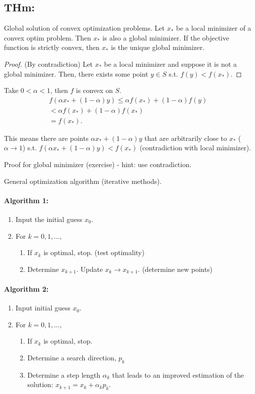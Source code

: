 \subsection*{THm:} Global solution of convex optimization problems. Let $x_*$ be a local minimizer of a convex optim problem. Then $x_*$ is also a global minimizer. If the objective function is strictly convex, then $x_*$ is the unique global minimizer.

\begin{proof}
(By contradiction) Let $x_*$ be a local minimizer and suppose it is not a global minimizer. Then, there exists some point $y\in S$ s.t. $ f(y) < f(x_*) $.
\end{proof}

Take $0 < \alpha < 1$, then $f$ is convex on $S$.
\begin{gather*}
f(\alpha x_* + (1-\alpha) y) \leq \alpha f(x_*) + (1-\alpha) f(y) \\
< \alpha f(x_*) + (1-\alpha) f(x_*) \\
= f(x_*).
\end{gather*}

This means there are points $\alpha x_* + (1-\alpha ) y$ that are arbitrarily close to $x_*$ ($\alpha \to 1$) s.t. $f(\alpha x_* + (1-\alpha ) y) < f(x_*)$ (contradiction with local minimizer).

Proof for global minimizer (exercise) - hint: use contradiction.

General optimization algorithm (iterative methods).

\paragraph*{Algorithm 1: }
\begin{enumerate}
\item Input the initial guess $x_0$.
\item For $k=0, 1, \ldots$,
	\begin{enumerate}
	\item If $x_k$ is optimal, stop. (test optimality)
	\item Determine $x_{k+1}$. Update $x_k \to x_{k+1}$. (determine new points)
	\end{enumerate}
\end{enumerate}

\paragraph*{Algorithm 2: }
\begin{enumerate}
\item Input initial guess $x_0$.
\item For $k = 0 , 1, \ldots$,
	\begin{enumerate}
	\item If $x_k$ is optimal, stop.
	\item Determine a search direction, $p_k$
	\item Determine a step length $\alpha_k$ that leads to an improved estimation of the solution: $x_{k+1} = x_k + \alpha_kp_k$.
	\end{enumerate}
\end{enumerate}

